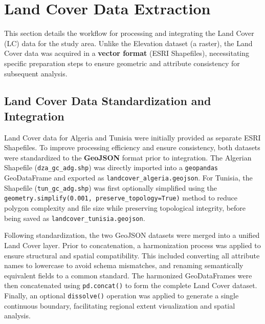 \section{Land Cover Data Extraction}

This section details the workflow for processing and integrating the Land Cover (LC) data for the study area. Unlike the Elevation dataset (a raster), the Land Cover data was acquired in a \textbf{vector format} (ESRI Shapefiles), necessitating specific preparation steps to ensure geometric and attribute consistency for subsequent analysis.

\subsection{Land Cover Data Standardization and Integration}

Land Cover data for Algeria and Tunisia were initially provided as separate ESRI Shapefiles. To improve processing efficiency and ensure consistency, both datasets were standardized to the \textbf{GeoJSON} format prior to integration. The Algerian Shapefile (\texttt{dza\_gc\_adg.shp}) 
was directly imported into a \texttt{geopandas} GeoDataFrame and exported as \texttt{landcover\_algeria.geojson}. For Tunisia, the Shapefile (\texttt{tun\_gc\_adg.shp}) was first optionally simplified using the \\ \texttt{geometry.simplify(0.001, preserve\_topology=True)} method to reduce polygon complexity and file size while preserving topological integrity, before being saved as \texttt{landcover\_tunisia.geojson}.

Following standardization, the two GeoJSON datasets were merged into a unified Land Cover layer. Prior to concatenation, a harmonization process was applied to ensure structural and spatial compatibility. This included converting all attribute names to lowercase to avoid schema mismatches, and renaming semantically equivalent fields to a common standard. The harmonized GeoDataFrames were then concatenated using \texttt{pd.concat()} to form the complete Land Cover dataset. Finally, an optional \texttt{dissolve()} operation was applied to generate a single continuous boundary, facilitating regional extent visualization and spatial analysis.




